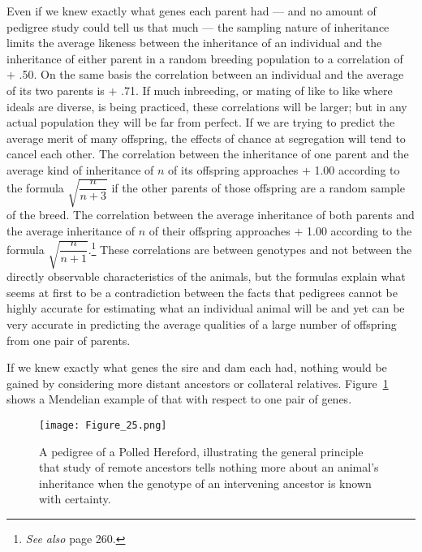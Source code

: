 Even if we knew exactly what genes each parent had --- and no
amount of pedigree study could tell us that much --- the sampling nature
of inheritance limits the average likeness between the inheritance of an
individual and the inheritance of either parent in a random breeding
population to a correlation of $+$ .50. On the same basis the correlation
between an individual and the average of its two parents is $+$ .71. If
much inbreeding, or mating of like to like where ideals are diverse, is
being practiced, these correlations will be larger; but in any actual
population they will be far from perfect. If we are trying to predict the
average merit of many offspring, the effects of chance at segregation will
tend to cancel each other. The correlation between the inheritance of
one parent and the average kind of inheritance of $n$ of its offspring
approaches $+$ 1.00 according to the formula \(\sqrt{\dfrac{n}{n + 3}}\)
if the other parents of those offspring are a random sample of the breed. The correlation
between the average inheritance of both parents and the average
inheritance of $n$ of their offspring approaches $+$ 1.00 according to the
formula \(\sqrt{\dfrac{n}{n + 1}}\).\footnote{\textit{See also} page 260.}
These correlations are between genotypes and not between the directly
observable characteristics of the animals, but the formulas explain what
seems at first to be a contradiction between the facts that pedigrees cannot
be highly accurate for estimating what an individual animal will be and yet
can be very accurate in predicting the average qualities of a large number
of offspring from one pair of parents.

If we knew exactly what genes the sire and dam each had, nothing
would be gained by considering more distant ancestors or collateral
relatives. Figure~\ref{fig:Lush_Figure_25} shows a Mendelian example
of that with respect to one pair of genes.

\begin{figure}
	\centering
    \texttt{[image: Figure\_25.png]}
    \caption{A pedigree of a Polled Hereford, illustrating the general principle that
			 study of remote ancestors tells nothing more about an animal's inheritance when the
			 genotype of an intervening ancestor is known with certainty.}
    \label{fig:Lush_Figure_25}
\end{figure}

